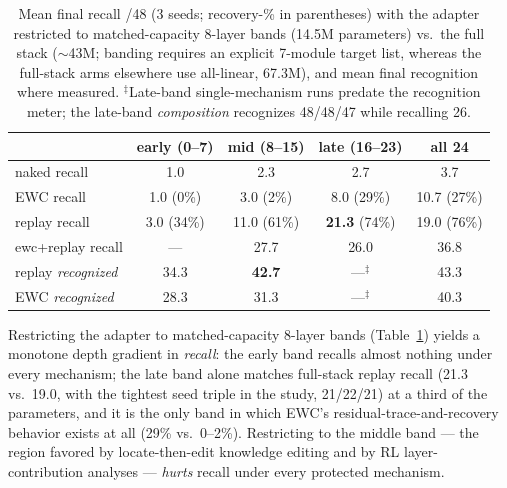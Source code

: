 \documentclass[11pt]{article}
\begin{document}
\begin{table}[h]
\centering\small
\begin{tabular}{lcccc}
\toprule
& early (0--7) & mid (8--15) & late (16--23) & all 24 \\
\midrule
naked recall  & 1.0 & 2.3 & 2.7 & 3.7 \\
EWC recall    & 1.0 \hfill (0\%) & 3.0 \hfill (2\%) & 8.0 \hfill (29\%) & 10.7 \hfill (27\%) \\
replay recall & 3.0 \hfill (34\%) & 11.0 \hfill (61\%) & \textbf{21.3} \hfill (74\%) & 19.0 \hfill (76\%) \\
ewc+replay recall & --- & 27.7 & 26.0 & 36.8 \\
\midrule
replay \emph{recognized} & 34.3 & \textbf{42.7} & ---$^\ddagger$ & 43.3 \\
EWC \emph{recognized} & 28.3 & 31.3 & ---$^\ddagger$ & 40.3 \\
\bottomrule
\end{tabular}
\caption{Mean final recall /48 (3 seeds; recovery-\% in parentheses) with the adapter restricted
to matched-capacity 8-layer bands (14.5M parameters) vs.\ the full stack ($\sim$43M; banding
requires an explicit 7-module target list, whereas the full-stack arms elsewhere use all-linear,
67.3M), and mean final recognition where measured. $^\ddagger$Late-band single-mechanism runs
predate the recognition meter; the late-band \emph{composition} recognizes 48/48/47 while
recalling 26.}
\label{tab:layers}
\end{table}

Restricting the adapter to matched-capacity 8-layer bands (Table~\ref{tab:layers}) yields a
monotone depth gradient in \emph{recall}: the early band recalls almost nothing under every
mechanism; the late band alone matches full-stack replay recall (21.3 vs.\ 19.0, with the
tightest seed triple in the study, 21/22/21) at a third of the parameters, and it is the only
band in which EWC's residual-trace-and-recovery behavior exists at all (29\% vs.\ 0--2\%).
Restricting to the middle band --- the region favored by locate-then-edit knowledge editing
\citep{meng2022rome,meng2023memit} and by RL layer-contribution analyses \citep{onelayer2026}
--- \emph{hurts} recall under every protected mechanism.
\end{document}
